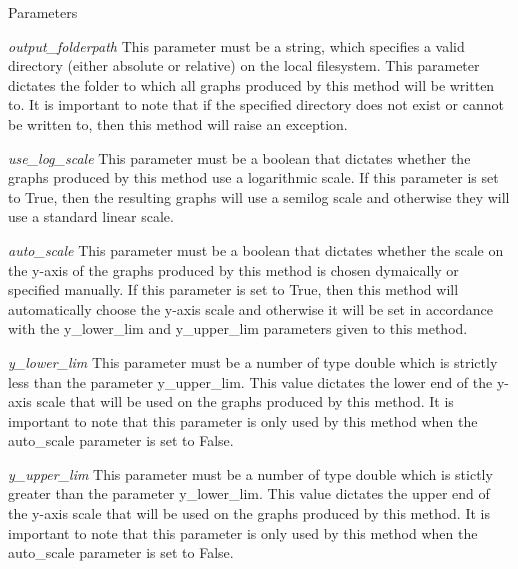 \begin{DoxyParams}{Parameters}
\item[{\em output\_\-folderpath}]This parameter must be a string, which specifies a valid directory (either absolute or relative) on the local filesystem. This parameter dictates the folder to which all graphs produced by this method will be written to. It is important to note that if the specified directory does not exist or cannot be written to, then this method will raise an exception. \item[{\em use\_\-log\_\-scale}]This parameter must be a boolean that dictates whether the graphs produced by this method use a logarithmic scale. If this parameter is set to True, then the resulting graphs will use a semilog scale and otherwise they will use a standard linear scale. \item[{\em auto\_\-scale}]This parameter must be a boolean that dictates whether the scale on the y-\/axis of the graphs produced by this method is chosen dymaically or specified manually. If this parameter is set to True, then this method will automatically choose the y-\/axis scale and otherwise it will be set in accordance with the y\_\-lower\_\-lim and y\_\-upper\_\-lim parameters given to this method. \item[{\em y\_\-lower\_\-lim}]This parameter must be a number of type double which is strictly less than the parameter y\_\-upper\_\-lim. This value dictates the lower end of the y-\/axis scale that will be used on the graphs produced by this method. It is important to note that this parameter is only used by this method when the auto\_\-scale parameter is set to False. \item[{\em y\_\-upper\_\-lim}]This parameter must be a number of type double which is stictly greater than the parameter y\_\-lower\_\-lim. This value dictates the upper end of the y-\/axis scale that will be used on the graphs produced by this method. It is important to note that this parameter is only used by this method when the auto\_\-scale parameter is set to False. \end{DoxyParams}
